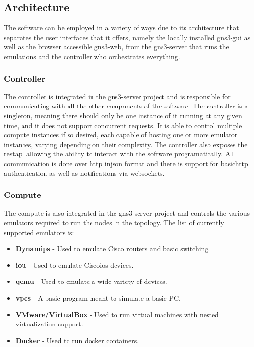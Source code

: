   \subsection{Architecture}
    The software can be employed in a variety of ways due to its architecture \cite{GNS3Architecture} that separates the user 
    interfaces that it offers, namely the locally installed gns3-gui as well as the browser accessible gns3-web, from the 
    gns3-server that runs the emulations and the controller who orchestrates everything.

    \subsubsection{Controller}
      The controller is integrated in the gns3-server project and is responsible for communicating with all the other components 
      of the software. The controller is a singleton, meaning there should only be one instance of it running at any given time, 
      and it does not support concurrent requests. It is able to control multiple compute instances if so desired, each capable 
      of hosting one or more emulator instances, varying depending on their complexity. The controller also exposes the
      \ac{rest}\ac{api} allowing the ability to interact with the software programatically. All communication is done over
      \ac{http} in\ac{json} format and there is support for basic\ac{http} authentication as well as notifications via websockets.

    \subsubsection{Compute}
      The compute is also integrated in the gns3-server project and controls the various emulators required to run the nodes 
      in the topology.
      The list of currently supported emulators is:

      \begin{itemize}
          \item \textbf{Dynamips} - Used to emulate Cisco routers and basic switching.
          \item \textbf{\ac{iou}} - Used to emulate Cisco\ac{ios} devices.
          \item \textbf{\ac{qemu}} - Used to emulate a wide variety of devices.
          \item \textbf{\ac{vpcs}} - A basic program meant to simulate a basic PC.
          \item \textbf{VMware/VirtualBox} - Used to run virtual machines with nested virtualization support.
          \item \textbf{Docker} - Used to run docker containers.
        \end{itemize}

